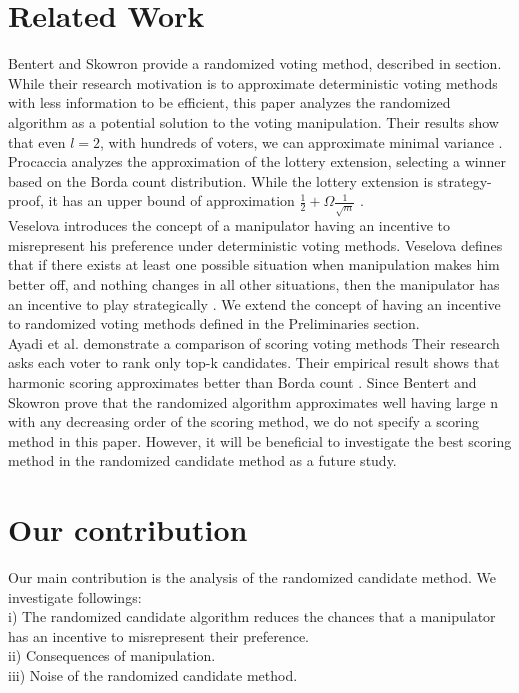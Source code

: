 \documentclass[letterpaper]{article} %
\begin{document}
\section{Related Work}
Bentert and Skowron provide a randomized voting method, described in  section. While their research motivation is to approximate deterministic voting methods with less information to be efficient, this paper analyzes the randomized algorithm as a potential solution to the voting manipulation. Their results show that even $l = 2$, with hundreds of voters, we can approximate minimal variance \cite{Skowron}.\\
Procaccia analyzes the approximation of the lottery extension, selecting a winner based on the Borda count distribution. While the lottery extension is strategy-proof, it has an upper bound of approximation $\frac{1}{2} +\Omega{ \frac{1}{\sqrt{m}} }$  \cite{Procaccia_1}.\\
Veselova introduces the concept of a manipulator having an incentive to misrepresent his preference under deterministic voting methods. Veselova defines that if there exists at least one possible situation when manipulation makes him better off, and nothing changes in all other situations, then the manipulator has an incentive to play strategically \cite{Veselova}. We extend the concept of having an incentive to randomized voting methods defined in the Preliminaries section.\\
Ayadi et al. demonstrate a comparison of scoring voting methods Their research asks each voter to rank only top-k candidates. Their empirical result shows that harmonic scoring approximates better than Borda count \cite{Ayadi}. Since Bentert and Skowron prove that the randomized algorithm approximates well having large n with any decreasing order of the scoring method, we do not specify a scoring method in this paper. However, it will be beneficial to investigate the best scoring method in the randomized candidate method as a future study.

\section{Our contribution}
Our main contribution is the analysis of the randomized candidate method. We investigate followings: \\
i) The randomized candidate algorithm reduces the chances that a manipulator has an incentive to misrepresent their preference. \\
ii) Consequences of manipulation.\\
iii) Noise of the randomized candidate method. 
\end{document}

